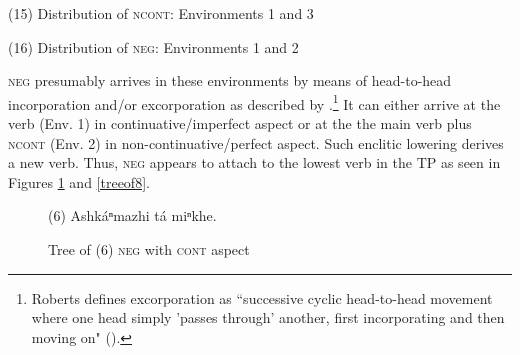 \documentclass[output=paper]{LSP/langsci}
\begin{document}
\vspace{1em}
(15)	Distribution of \textsc{ncont}:	Environments 1 and 3

\vspace{1em}
(16)	Distribution of \textsc{neg}:	Environments 1 and 2

\vspace{1em}
\textsc{neg} presumably arrives in these environments by means of head-to-head incorporation and/or excorporation as described by \citet{Roberts1991}.\footnote{Roberts defines excorporation as ``successive cyclic head-to-head movement where one head simply 'passes through' another, first incorporating and then moving on" (\citeyear[211]{Roberts1991}).} It can either arrive at the verb (Env. 1) in continuative/imperfect aspect or at the the main verb plus \textsc{ncont} (Env. 2) in non-continuative/perfect aspect. Such enclitic lowering derives a new verb. Thus, \textsc{neg} appears to attach to the lowest verb in the TP as seen in Figures \ref{treeof6} and \ref{treeof8}.

\begin{figure}
\caption{Tree of (6) \textsc{neg} with \textsc{cont} aspect} \label{treeof6}
\begin{center}
(6) Ashkáⁿmazhi tá miⁿkhe.

\end{center}
\end{figure}
\end{document}
